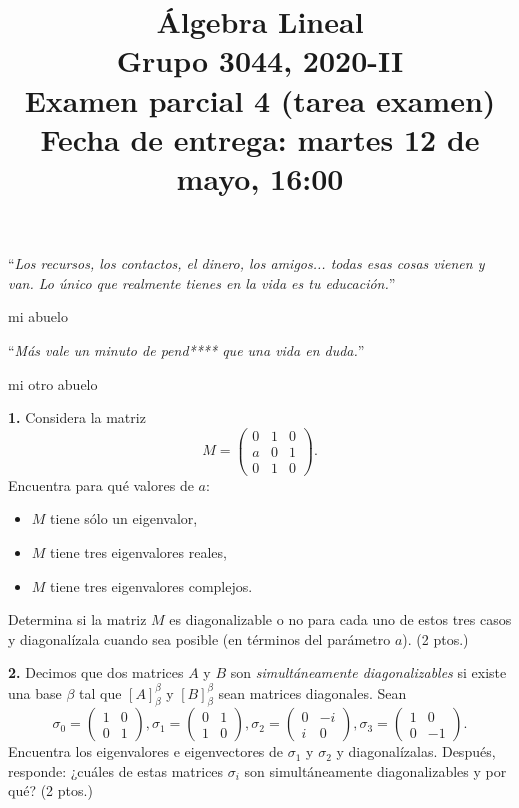 \documentclass[a4paper]{article}
\begin{document}
\title{Álgebra Lineal \\ Grupo 3044, 2020-II \\ Examen parcial 4 (tarea examen) \\ Fecha de entrega: martes 12 de mayo, 16:00}
\date{}
\maketitle

\epigraph{``\textit{Los recursos, los contactos, el dinero, los amigos... todas esas cosas vienen y van. Lo único que realmente tienes en la vida es tu educación.}''}{\textemdash mi abuelo}

\epigraph{``\textit{Más vale un minuto de pend**** que una vida en duda.}''}{\textemdash mi otro abuelo}

\vspace{5mm}
\textbf{1.} Considera la matriz \[
    M = \begin{pmatrix}0&1&0\\a&0&1\\0&1&0\end{pmatrix}
.\] Encuentra para qué valores de $a$:
\begin{itemize}
    \item $M$ tiene sólo un eigenvalor,
    \item $M$ tiene tres eigenvalores reales,
    \item $M$ tiene tres eigenvalores complejos.
\end{itemize}
Determina si la matriz $M$ es diagonalizable o no para cada uno de estos tres casos y diagonalízala cuando sea posible (en términos del parámetro $a$). (2 ptos.)

\vspace{5mm}
\textbf{2.} Decimos que dos matrices $A$ y $B$ son \emph{simultáneamente diagonalizables} si existe una base $\beta$ tal que $[A]_{\beta}^{\beta}$ y $[B]_{\beta}^{\beta}$ sean matrices diagonales. Sean \[
\sigma_0=\begin{pmatrix}1&0\\0&1\end{pmatrix}, \sigma_1=\begin{pmatrix}0&1\\1&0\end{pmatrix}, \sigma_2=\begin{pmatrix}0&-i\\i&0\end{pmatrix}, \sigma_3=\begin{pmatrix}1&0\\0&-1\end{pmatrix}
.\] Encuentra los eigenvalores e eigenvectores de $\sigma_1$ y $\sigma_2$  y diagonalízalas. Después, responde: ¿cuáles de estas matrices $\sigma_i$ son simultáneamente diagonalizables y por qué? (2 ptos.)
\end{document}
